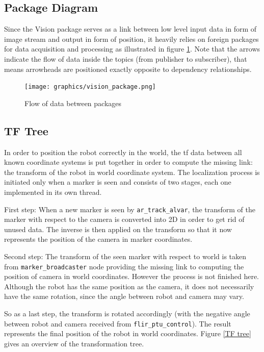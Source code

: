 \subsection{Package Diagram}
Since the Vision package serves as a link between low level input data in form of image stream and output in form of position, it heavily relies on foreign packages for data acquisition and processing as illustrated in figure \ref{Vision Package Diagram}. Note that the arrows indicate the flow of data inside the topics (from publisher to subscriber), that means arrowheads are positioned exactly opposite to dependency relationships.

\begin{figure}
\begin{center}
\texttt{[image: graphics/vision\_package.png]}
\caption{Flow of data between packages}
\label{Vision Package Diagram}
\end{center}
\end{figure}

\subsection{TF Tree}
In order to position the robot correctly in the world, the tf data between all known coordinate systems is put together in order to compute the missing link: the transform of the robot in world coordinate system. The localization process is initiated only when a marker is seen and consists of two stages, each one implemented in its own thread.

First step: When a new marker is seen by \texttt{ar\_track\_alvar}, the transform of the marker with respect to the camera is converted into 2D in order to get rid of unused data. The inverse is then applied on the transform so that it now represents the position of the camera in marker coordinates.

Second step: The transform of the seen marker with respect to world is taken from \texttt{marker\_broadcaster} node providing the missing link to computing the position of camera in world coordinates. However the process is not finished here. Although the robot has the same position as the camera, it does not necessarily have the same rotation, since the angle between robot and camera may vary.

So as a last step, the transform is rotated accordingly (with the negative angle between robot and camera received from \texttt{flir\_ptu\_control}). The result represents the final position of the robot in world coordinates. Figure \ref{TF tree} gives an overview of the transformation tree.

